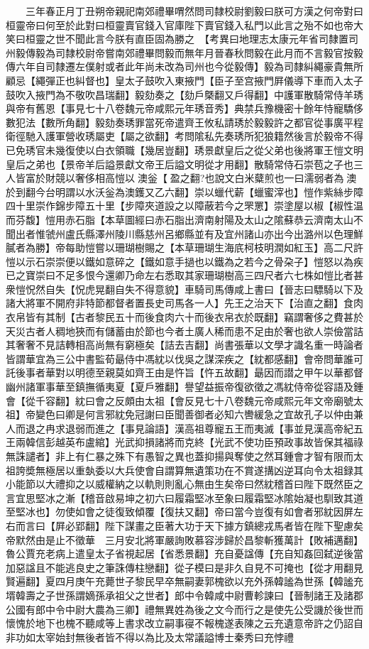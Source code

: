 　　三年春正月丁丑朔帝親祀南郊禮畢喟然問司隸校尉劉毅曰朕可方漢之何帝對曰桓靈帝曰何至於此對曰桓靈賣官錢入官庫陛下賣官錢入私門以此言之殆不如也帝大笑曰桓靈之世不聞此言今朕有直臣固為勝之　【考異曰地理志太康元年省司隸置司州毅傳毅為司隸校尉帝嘗南郊禮畢問毅而無年月晉春秋問毅在此月而不言毅官按毅傳六年自司隸遷左僕射或者此年尚未改為司州也今從毅傳】毅為司隸糾繩豪貴無所顧忌【繩彈正也糾督也】皇太子鼓吹入東掖門【臣子至宫掖門屛儀導下車而入太子鼓吹入掖門為不敬吹昌瑞翻】毅劾奏之【劾戶槩翻又戶得翻】中護軍散騎常侍羊琇與帝有舊恩【事見七十八卷魏元帝咸熙元年琇音秀】典禁兵豫機密十餘年恃寵驕侈數犯法【數所角翻】毅劾奏琇罪當死帝遣齊王攸私請琇於毅毅許之都官從事廣平程衛徑馳入護軍營收琇屬吏【屬之欲翻】考問隂私先奏琇所犯狼籍然後言於毅帝不得已免琇官未幾復使以白衣領職【幾居豈翻】琇景獻皇后之從父弟也後將軍王愷文明皇后之弟也【景帝羊后謚景獻文帝王后謚文明從才用翻】散騎常侍石崇苞之子也三人皆富於財競以奢侈相高愷以澳釡【盈之翻?也說文白米糵煎也一曰濡弱者為澳於到翻今台明謂以水沃釡為澳鑊又乙六翻】崇以蠟代薪【蠟蜜滓也】愷作紫絲步障四十里崇作錦步障五十里【步障夾道設之以障蔽若今之罘罳】崇塗屋以椒【椒性温而芬馥】愷用赤石脂【本草圖經曰赤石脂出濟南射陽及太山之隂蘇恭云濟南太山不聞出者惟虢州盧氏縣澤州陵川縣慈州呂鄉縣並有及宜州諸山亦出今出潞州以色理鮮膩者為勝】帝每助愷嘗以珊瑚樹賜之【本草珊瑚生海㡳柯枝明潤如紅玉】高二尺許愷以示石崇崇便以鐵如意碎之【鐵如意手撾也以鐵為之若今之骨朶子】愷怒以為疾已之寶崇曰不足多恨今還卿乃命左右悉取其家珊瑚樹高三四尺者六七株如愷比者甚衆愷怳然自失【怳虎晃翻自失不得意貌】車騎司馬傳咸上書曰【晉志曰驃騎以下及諸大將軍不開府非特節都督者置長史司馬各一人】先王之治天下【治直之翻】食肉衣帛皆有其制【古者黎民五十而後食肉六十而後衣帛衣於既翻】竊謂奢侈之費甚於天災古者人稠地狹而有儲蓄由於節也今者土廣人稀而患不足由於奢也欲人崇儉當詰其奢奢不見詰轉相高尚無有窮極矣【詰去吉翻】尚書張華以文學才識名重一時論者皆謂華宜為三公中書監荀朂侍中馮紞以伐吳之謀深疾之【紞都感翻】會帝問華誰可託後事者華對以明德至親莫如齊王由是忤旨【忤五故翻】朂因而譛之甲午以華都督幽州諸軍事華至鎮撫循夷夏【夏戶雅翻】譽望益振帝復欲徵之馮紞侍帝從容語及鍾會【從千容翻】紞曰會之反頗由太祖【會反見七十八卷魏元帝咸熙元年文帝廟號太祖】帝變色曰卿是何言邪紞免冠謝曰臣聞善御者必知六轡緩急之宜故孔子以仲由兼人而退之冉求退弱而進之【事見論語】漢高祖尊寵五王而夷滅【事並見漢高帝紀五王兩韓信彭越英布盧綰】光武抑損諸將而克終【光武不使功臣預政事故皆保其福祿無誅譴者】非上有仁暴之殊下有愚智之異也蓋抑揚與奪使之然耳鍾會才智有限而太祖誇奬無極居以重埶委以大兵使會自謂算無遺策功在不賞遂搆凶逆耳向令太祖録其小能節以大禮抑之以威權納之以軌則則亂心無由生矣帝曰然紞稽首曰陛下既然臣之言宜思堅冰之漸【稽音啟易坤之初六曰履霜堅冰至象曰履霜堅冰隂始凝也馴致其道至堅冰也】勿使如會之徒復致傾覆【復扶又翻】帝曰當今豈復有如會者邪紞因屏左右而言曰【屛必郢翻】陛下謀畫之臣著大功于天下據方鎮總戎馬者皆在陛下聖慮矣帝默然由是止不徵華　三月安北將軍嚴詢敗慕容涉歸於昌黎斬獲萬計【敗補邁翻】　魯公賈充老病上遣皇太子省視起居【省悉景翻】充自憂諡傳【充自知姦回弑逆後當加惡諡且不能逃良史之筆誅傳柱戀翻】從子模曰是非久自見不可掩也【從才用翻見賢遍翻】夏四月庚午充薨世子黎民早卒無嗣妻郭槐欲以充外孫韓謐為世孫【韓謐充壻韓壽之子世孫謂嫡孫承祖父之世者】郎中令韓咸中尉曹軫諫曰【晉制諸王及諸郡公國有郎中令中尉大農為三卿】禮無異姓為後之文今而行之是使先公受譏於後世而懷愧於地下也槐不聽咸等上書求改立嗣事寑不報槐遂表陳之云充遺意帝許之仍詔自非功如太宰始封無後者皆不得以為比及太常議謚博士秦秀曰充悖禮